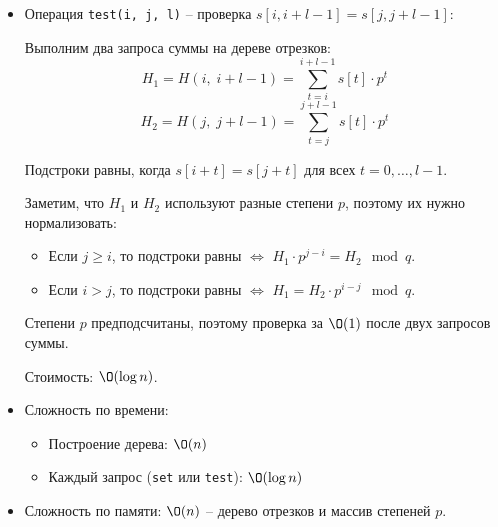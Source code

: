 \begin{enumerate}
\begin{itemize}
      \item Операция \texttt{test(i, j, l)} -- проверка $s[i, i+l-1] = s[j, j+l-1]$:
      
      Выполним два запроса суммы на дереве отрезков:
      $$H_1 = H(i, \; i+l-1) = \sum_{t=i}^{i+l-1} s[t] \cdot p^t$$
      $$H_2 = H(j, \; j+l-1) = \sum_{t=j}^{j+l-1} s[t] \cdot p^t$$

      Подстроки равны, когда $s[i+t] = s[j+t]$ для всех $t = 0, \ldots, l-1$.
      
      Заметим, что $H_1$ и $H_2$ используют разные степени $p$, поэтому их нужно нормализовать:

      \begin{itemize}
        \item Если $j \geq i$, то подстроки равны $\Leftrightarrow$ $H_1 \cdot p^{j-i} = H_2 \mod q$.

        \item Если $i > j$, то подстроки равны $\Leftrightarrow$ $H_1 = H_2 \cdot p^{i-j} \mod q$.
      \end{itemize}

      Степени $p$ предподсчитаны, поэтому проверка за $\O(1)$ после двух запросов суммы.

      Стоимость: $\O(\log n)$.

      \item Сложность по времени:
      \begin{itemize}
        \item Построение дерева: $\O(n)$
        \item Каждый запрос (\texttt{set} или \texttt{test}): $\O(\log n)$
      \end{itemize}

      \item Сложность по памяти: $\O(n)$ -- дерево отрезков и массив степеней $p$.

    \end{itemize}

\end{enumerate}